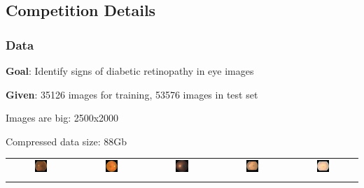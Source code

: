 \documentclass{beamer}
\begin{document}
\subsection{Competition Details}
\begin{frame}\frametitle{Data} 
\par \textbf{Goal}: Identify signs of diabetic retinopathy in eye images
\par \textbf{Given}: 35126 images for training, 53576 images in test set
\par Images are big: 2500x2000
\par Compressed data size: 88Gb

\vspace{5pt}

\begin{tabular}{|@{}c@{}|@{}c@{}|@{}c@{}|@{}c@{}|@{}c@{}|}
\hline
	\includegraphics[width=0.2\textwidth]{pics/197_left_0.jpg} &
	\includegraphics[width=0.2\textwidth]{pics/204_right_1.jpg} &
	\includegraphics[width=0.2\textwidth]{pics/257_left_2.jpg} &
	\includegraphics[width=0.2\textwidth]{pics/328_right_3.jpg} &
	\includegraphics[width=0.2\textwidth]{pics/326_left_4.jpg} \\\noalign{\vspace{-0.15cm}}
\hline


\end{tabular}
\end{frame}
\end{document}
